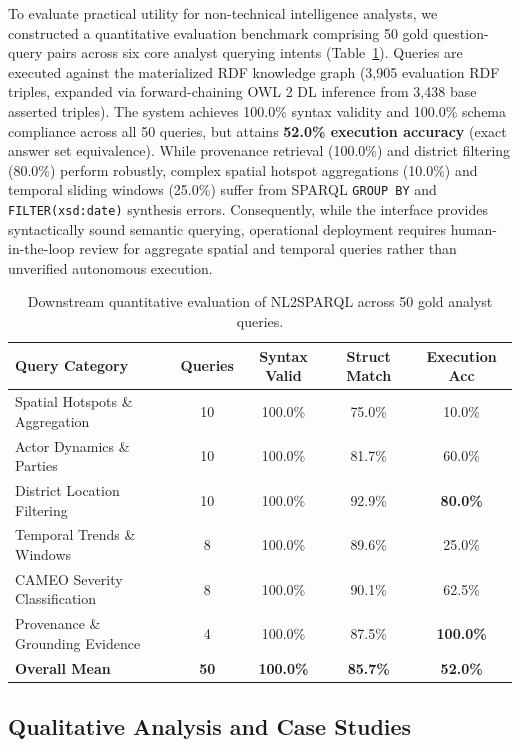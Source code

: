 \documentclass[11pt,a4paper]{article}
\begin{document}
To evaluate practical utility for non-technical intelligence analysts, we constructed a quantitative evaluation benchmark comprising 50 gold question-query pairs across six core analyst querying intents (Table~\ref{tab:nl2sparql}).
Queries are executed against the materialized RDF knowledge graph (3,905 evaluation RDF triples, expanded via forward-chaining OWL 2 DL inference from 3,438 base asserted triples).
The system achieves 100.0\% syntax validity and 100.0\% schema compliance across all 50 queries, but attains \textbf{52.0\% execution accuracy} (exact answer set equivalence).
While provenance retrieval (100.0\%) and district filtering (80.0\%) perform robustly, complex spatial hotspot aggregations (10.0\%) and temporal sliding windows (25.0\%) suffer from SPARQL \texttt{GROUP BY} and \texttt{FILTER(xsd:date)} synthesis errors.
Consequently, while the interface provides syntactically sound semantic querying, operational deployment requires human-in-the-loop review for aggregate spatial and temporal queries rather than unverified autonomous execution.

\begin{table}[h]
\centering
\small
\caption{Downstream quantitative evaluation of NL2SPARQL across 50 gold analyst queries.}
\label{tab:nl2sparql}
\begin{tabular}{lcccc}
\toprule
\textbf{Query Category} & \textbf{Queries} & \textbf{Syntax Valid} & \textbf{Struct Match} & \textbf{Execution Acc} \\
\midrule
Spatial Hotspots \& Aggregation   & 10 & 100.0\% & 75.0\% & 10.0\% \\
Actor Dynamics \& Parties         & 10 & 100.0\% & 81.7\% & 60.0\% \\
District Location Filtering       & 10 & 100.0\% & 92.9\% & \textbf{80.0\%} \\
Temporal Trends \& Windows        & 8  & 100.0\% & 89.6\% & 25.0\% \\
CAMEO Severity Classification     & 8  & 100.0\% & 90.1\% & 62.5\% \\
Provenance \& Grounding Evidence  & 4  & 100.0\% & 87.5\% & \textbf{100.0\%} \\
\midrule
\textbf{Overall Mean}             & \textbf{50} & \textbf{100.0\%} & \textbf{85.7\%} & \textbf{52.0\%} \\
\bottomrule
\end{tabular}
\end{table}

\subsection{Qualitative Analysis and Case Studies}
\label{sec:casestudies}
\end{document}
